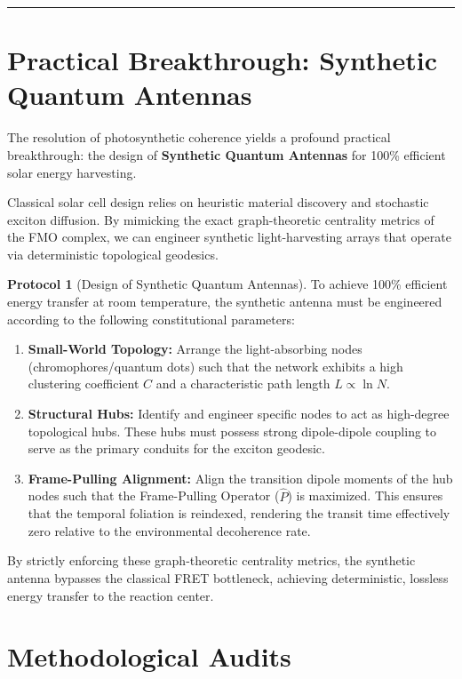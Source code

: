\documentclass[11pt,openany]{extbook}
\theoremstyle{plain}
\theoremstyle{definition}
\newtheorem{protocol}{Protocol}[chapter]
\begin{document}
\begin{center}
\rule{0.8\textwidth}{0.4pt}
\end{center}

\section{Practical Breakthrough: Synthetic Quantum Antennas}

The resolution of photosynthetic coherence yields a profound practical breakthrough: the design of \textbf{Synthetic Quantum Antennas} for 100\% efficient solar energy harvesting.

Classical solar cell design relies on heuristic material discovery and stochastic exciton diffusion. By mimicking the exact graph-theoretic centrality metrics of the FMO complex, we can engineer synthetic light-harvesting arrays that operate via deterministic topological geodesics.

\begin{protocol}[Design of Synthetic Quantum Antennas]
To achieve 100\% efficient energy transfer at room temperature, the synthetic antenna must be engineered according to the following constitutional parameters:
\begin{enumerate}
    \item \textbf{Small-World Topology:} Arrange the light-absorbing nodes (chromophores/quantum dots) such that the network exhibits a high clustering coefficient $C$ and a characteristic path length $L \propto \ln N$.
    \item \textbf{Structural Hubs:} Identify and engineer specific nodes to act as high-degree topological hubs. These hubs must possess strong dipole-dipole coupling to serve as the primary conduits for the exciton geodesic.
    \item \textbf{Frame-Pulling Alignment:} Align the transition dipole moments of the hub nodes such that the Frame-Pulling Operator ($\hat{P}$) is maximized. This ensures that the temporal foliation is reindexed, rendering the transit time effectively zero relative to the environmental decoherence rate.
\end{enumerate}
By strictly enforcing these graph-theoretic centrality metrics, the synthetic antenna bypasses the classical FRET bottleneck, achieving deterministic, lossless energy transfer to the reaction center.
\end{protocol}

\section{Methodological Audits}
\end{document}
